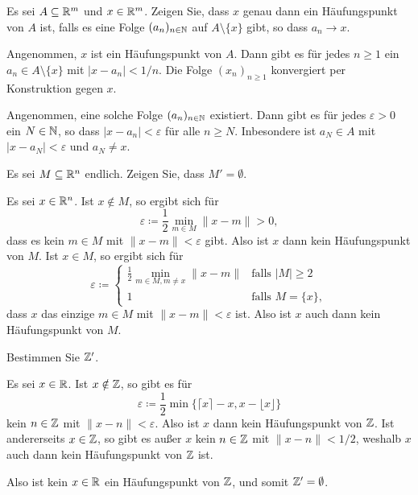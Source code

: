 \documentclass[a4paper,10pt]{article}
\begin{document}
\begin{question}
 Es sei $A \subseteq \mathbb{R}^m$ und $x \in \mathbb{R}^m$. Zeigen Sie, dass $x$ genau dann ein Häufungspunkt von $A$ ist, falls es eine Folge $(a_n)_{n \in \mathbb{N}}$ auf $A \setminus \{x\}$ gibt, so dass $a_n \to x$.
\end{question}
\begin{solution}
 Angenommen, $x$ ist ein Häufungspunkt von $A$. Dann gibt es für jedes $n \geq 1$ ein $a_n \in A \setminus \{x\}$ mit $|x-a_n| < 1/n$. Die Folge $(x_n)_{n \geq 1}$ konvergiert per Konstruktion gegen $x$.
 
 Angenommen, eine solche Folge $(a_n)_{n \in \mathbb{N}}$ existiert. Dann gibt es für jedes $\varepsilon > 0$ ein $N \in \mathbb{N}$, so dass $|x-a_n| < \varepsilon$ für alle $n \geq N$. Inbesondere ist $a_N \in A$ mit $|x-a_N| < \varepsilon$ und $a_N \neq x$.
\end{solution}


\begin{question}
 Es sei $M \subseteq \mathbb{R}^n$ endlich. Zeigen Sie, dass $M' = \emptyset$.
\end{question}
\begin{solution}
 Es sei $x \in \mathbb{R}^n$. Ist $x \notin M$, so ergibt sich für
 \[
  \varepsilon \coloneqq \frac{1}{2} \min_{m \in M} \|x-m\| > 0,
 \]
 dass es kein $m \in M$ mit $\|x-m\| < \varepsilon$ gibt. Also ist $x$ dann kein Häufungspunkt von $M$. Ist $x \in M$, so ergibt sich für
 \[
  \varepsilon
  \coloneqq
  \begin{cases}
   \frac{1}{2} \min_{m \in M, m \neq x} \|x-m\| & \text{falls $|M| \geq 2$} \\
                                               1 & \text{falls $M = \{x\}$},
  \end{cases}
 \]
 dass $x$ das einzige $m \in M$ mit $\|x-m\| < \varepsilon$ ist. Also ist $x$ auch dann kein Häufungspunkt von $M$.
\end{solution}


\begin{question}
 Bestimmen Sie $\mathbb{Z}'$.
\end{question}
\begin{solution}
 Es sei $x \in \mathbb{R}$. Ist $x \notin \mathbb{Z}$, so gibt es für
 \[
  \varepsilon \coloneq \frac{1}{2} \min\{ \lceil x \rceil - x, x - \lfloor x \rfloor \}
 \]
 kein $n \in \mathbb{Z}$ mit $\|x-n\| < \varepsilon$. Also ist $x$ dann kein Häufungspunkt von $\mathbb{Z}$. Ist andererseits $x \in \mathbb{Z}$, so gibt es außer $x$ kein $n \in \mathbb{Z}$ mit $\|x-n\| < 1/2$, weshalb $x$ auch dann kein Häufungspunkt von $\mathbb{Z}$ ist.
 
 Also ist kein $x \in \mathbb{R}$ ein Häufungspunkt von $\mathbb{Z}$, und somit $\mathbb{Z}' = \emptyset$.
\end{solution}
\end{document}
